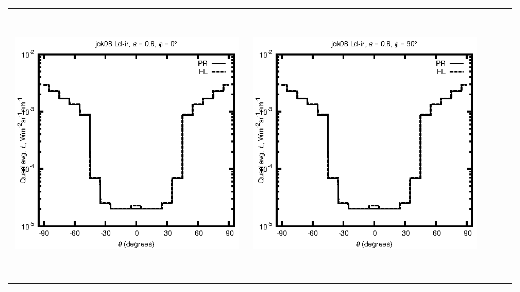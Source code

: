 \documentclass[10pt,a4paper]{article}
\begin{document}
\begin{adjustwidth}{-1.2in}{-1.2in}
\begin{tabular}{c c c c}
\includegraphics[height=7cm]{../eps/jok06_Ld_ir_fwd.eps} &
\includegraphics[height=7cm]{../eps/jok06_Ld_ir_cross.eps} \\
\end{tabular}

\pagebreak


\end{adjustwidth}
\end{document}
